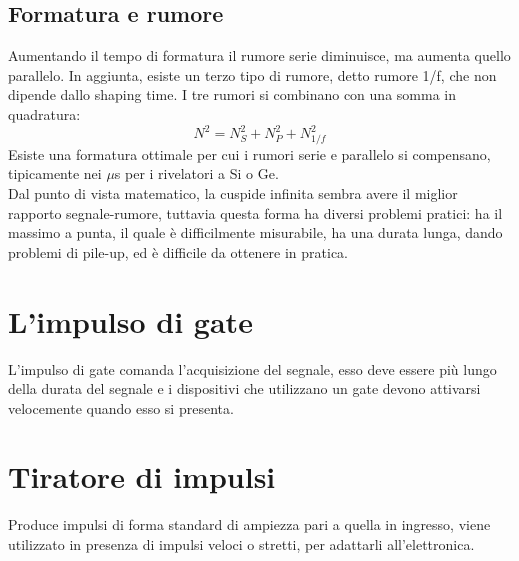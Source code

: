 \subsection{Formatura e rumore}
Aumentando il tempo di formatura il rumore serie diminuisce, ma aumenta quello parallelo.
In aggiunta, esiste un terzo tipo di rumore, detto rumore 1/f, che non dipende dallo shaping time.
I tre rumori si combinano con una somma in quadratura:
\begin{equation*}
N^2 = N_S^2 + N_P^2+N_{1/f}^2
\end{equation*}
Esiste una formatura ottimale per cui i rumori serie e parallelo si compensano, tipicamente nei $\mu$s per i rivelatori a Si o Ge.\\
Dal punto di vista matematico, la cuspide infinita sembra avere il miglior rapporto segnale-rumore, tuttavia questa forma ha diversi problemi pratici:
ha il massimo a punta, il quale \`e difficilmente misurabile, ha una durata lunga, dando problemi di pile-up, ed \`e difficile da ottenere in pratica.
\section{L'impulso di gate}
L'impulso di gate comanda l'acquisizione del segnale, esso deve essere pi\`u lungo della durata del segnale e i dispositivi che utilizzano un gate devono attivarsi velocemente
quando esso si presenta.
\section{Tiratore di impulsi}
Produce impulsi di forma standard di ampiezza pari a quella in ingresso, viene utilizzato in presenza di impulsi veloci o stretti, per adattarli all'elettronica.